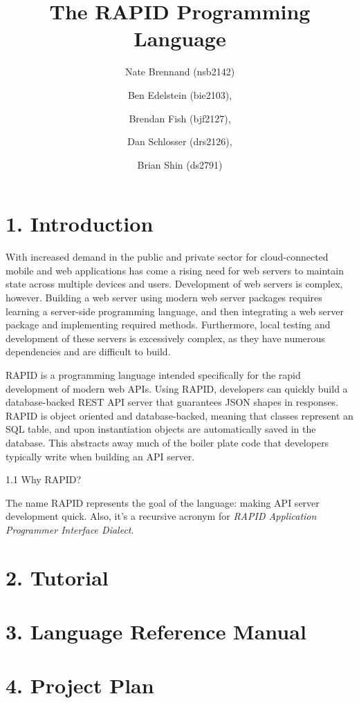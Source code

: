 \documentclass[11pt]{article}
\author{
  Nate Brennand (nsb2142)
  \and Ben Edelstein (bie2103),
  \and Brendan Fish (bjf2127),
  \and Dan Schlosser (drs2126),
  \and Brian Shin (ds2791)
}
\title{The RAPID Programming Language}
\begin{document}
\setlength{\parskip}{.1 in}

\maketitle
\newpage

\section*{1. Introduction}

With increased demand in the public and private sector for cloud-connected mobile and web applications has come a rising need for web servers to maintain state across multiple devices and users.
Development of web servers is complex, however. Building a web server using modern web server packages requires learning a server-side programming language, and then integrating a web server package and implementing required methods.
Furthermore, local testing and development of these servers is excessively complex, as they have numerous dependencies and are difficult to build.

RAPID is a programming language intended specifically for the rapid development of modern web APIs.
Using RAPID, developers can quickly build a database-backed REST API server that guarantees JSON shapes in responses.
RAPID is object oriented and database-backed, meaning that classes represent an SQL table, and upon instantiation objects are automatically saved in the database.
This abstracts away much of the boiler plate code that developers typically write when building an API server.


1.1 Why RAPID?

The name RAPID represents the goal of the language: making API server development quick.
Also, it's a recursive acronym for \textit{RAPID Application Programmer Interface Dialect}.



\section*{2. Tutorial}

\newpage

\section*{3. Language Reference Manual}

\newpage

\section*{4. Project Plan}

\newpage
\end{document}
